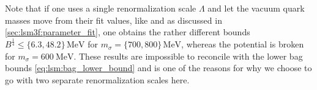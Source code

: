 Note that if one uses a single renormalization scale $\Lambda$ and let the vacuum quark masses move from their fit values,
like \cite{ref:master_berge} and as discussed in \cref{sec:lsm3f:parameter_fit},
one obtains the rather different bounds $B^\frac14 \leq \{6.3,48.2\} \, \si{\mega\electronvolt}$ for $m_\sigma=\{700,800\}\,\si{\mega\electronvolt}$,
whereas the potential is broken for $m_\sigma=\SI{600}{\mega\electronvolt}$.
These results are impossible to reconcile with the lower bag bounds \eqref{eq:lsm:bag_lower_bound}
and is one of the reasons for why we choose to go with two separate renormalization scales here.

\makeatletter
\long{}%
\makeatother

